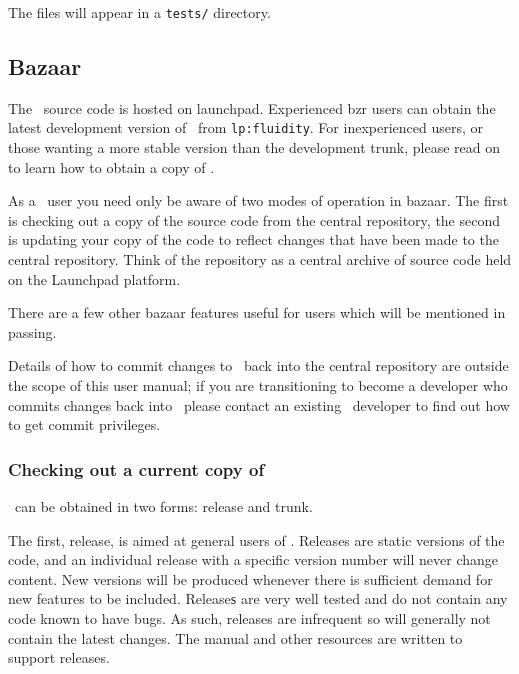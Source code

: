 The files will appear in a \lstinline[language=Bash]+tests/+ directory.

\subsection{Bazaar}
\label{sec:bazaar}

The \fluidity\ source code is hosted on launchpad. Experienced bzr users can
obtain the latest development version of \fluidity\ from
\lstinline[language=Bash]+lp:fluidity+. For inexperienced users, or those
wanting a more stable version than the development trunk, please read on to
learn how to obtain a copy of \fluidity.

As a \fluidity\ user you need only be aware of two modes of operation in
bazaar. The first is checking out a copy of the source code from the
central repository, the second is updating your copy of the code to reflect
changes that have been made to the central repository. Think of the repository
as a central archive of source code held on the Launchpad platform.

There are a few other bazaar features useful for users which will be mentioned
in passing.

Details of how to commit changes to \fluidity\ back into the central repository
are outside the scope of this user manual; if you are transitioning to become a
developer who commits changes back into \fluidity\ please contact an existing
\fluidity\ developer to find out how to get commit privileges.

\subsubsection{Checking out a current copy of \fluidity}
\label{sec:subversion_checkout_current}

\fluidity\ can be obtained in two forms: release and trunk.

The first, release, is aimed at general users of \fluidity. Releases are static
versions of the code, and an individual release with a specific version number
will never change content. New versions will be produced whenever there is
sufficient demand for new features to be included. Releaseѕ are very well
tested and do not contain any code known to have bugs. As such, releases are
infrequent so will generally not contain the latest changes. The manual and
other resources are written to support releases.

